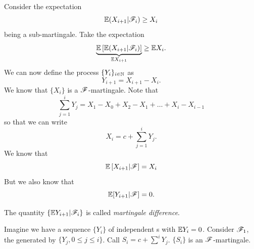 \documentclass{report}
\begin{document}
\begin{fancyproof}
	Consider the expectation
	\[\mathbb{E}(X_{i+1}|\mathscr{F}_i)\geq X_i\]
	being a sub-martingale. Take the expectation
	\[\underbrace{\mathbb{E}\left[\mathbb{E}(X_{i+1}|\mathscr{F}_i)\right]}_{\mathbb{E} X_{i+1}}\geq\mathbb{E} X_i.\]
	We can now define the process
	$\{Y_{i}\}_{i\in\mathbb{N}}$ as 
	\[Y_{i+1}=X_{i+1}-X_{i}.\]
	We know that $\{X_i\}$ is a $\mathscr{F}$-martingale. Note that
	\[\sum_{j=1}^{i} Y_j=X_1-X_0+X_2-X_1+\ldots+X_i-X_{i-1}\]
	so that we can write
	\[X_i=c+\sum_{j=1}^{i}Y_j.\]
	We know that 
	\[\mathbb{E}\left[X_{i+1}|\mathscr{F}\right]=X_i\]
	But we also know that 
	\begin{equation*}
	\mathbb{E}[Y_{i+1}|\mathscr{F}]=0.
	\end{equation*}
\end{fancyproof}
The quantity $\{\mathbb{E}{Y_{i+1}|\mathscr{F}_i}\}$ is called \emph{martingale difference}.
\begin{example}
	Imagine we have a sequence $\{Y_i\}$ of independent \rv s with $\mathbb{E} Y_i=0$.
	Consider $\mathscr{F}_1$, the \sa{} generated by $\{Y_j,0\leq j\leq i\}$. Call $S_i=c+\sum^{i}Y_{j}$. 
	$\{S_i\}$ is an $\mathscr{F}$-martingale.
\end{example}
\end{document}

